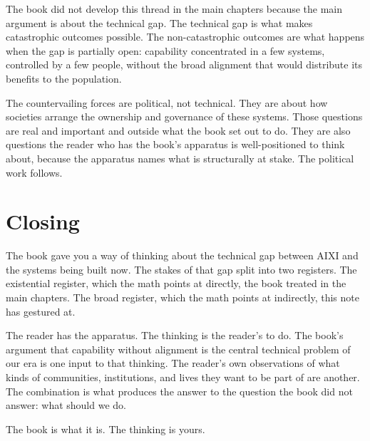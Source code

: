 The book did not develop this thread in the main chapters because the main argument is about the technical gap. The technical gap is what makes catastrophic outcomes possible. The non-catastrophic outcomes are what happens when the gap is partially open: capability concentrated in a few systems, controlled by a few people, without the broad alignment that would distribute its benefits to the population.

The countervailing forces are political, not technical. They are about how societies arrange the ownership and governance of these systems. Those questions are real and important and outside what the book set out to do. They are also questions the reader who has the book's apparatus is well-positioned to think about, because the apparatus names what is structurally at stake. The political work follows.

\section*{Closing}

The book gave you a way of thinking about the technical gap between AIXI and the systems being built now. The stakes of that gap split into two registers. The existential register, which the math points at directly, the book treated in the main chapters. The broad register, which the math points at indirectly, this note has gestured at.

The reader has the apparatus. The thinking is the reader's to do. The book's argument that capability without alignment is the central technical problem of our era is one input to that thinking. The reader's own observations of what kinds of communities, institutions, and lives they want to be part of are another. The combination is what produces the answer to the question the book did not answer: what should we do.

The book is what it is. The thinking is yours.
